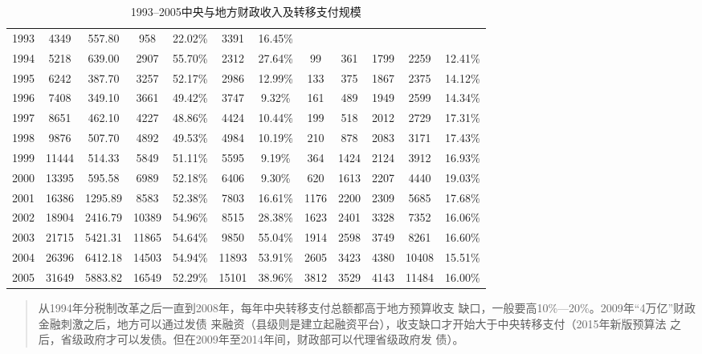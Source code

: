 \begin{table}[]
{\begin{tabular}{@{}cccccccccccc@{}}
1993 & 4349  & 557.80  & 958   & 22.02\% & 3391  & 16.45\% &      &      &      &       &         \\
1994 & 5218  & 639.00  & 2907  & 55.70\% & 2312  & 27.64\% & 99   & 361  & 1799 & 2259  & 12.41\% \\
1995 & 6242  & 387.70  & 3257  & 52.17\% & 2986  & 12.99\% & 133  & 375  & 1867 & 2375  & 14.12\% \\
1996 & 7408  & 349.10  & 3661  & 49.42\% & 3747  & 9.32\%  & 161  & 489  & 1949 & 2599  & 14.34\% \\
1997 & 8651  & 462.10  & 4227  & 48.86\% & 4424  & 10.44\% & 199  & 518  & 2012 & 2729  & 17.31\% \\
1998 & 9876  & 507.70  & 4892  & 49.53\% & 4984  & 10.19\% & 210  & 878  & 2083 & 3171  & 17.43\% \\
1999 & 11444 & 514.33  & 5849  & 51.11\% & 5595  & 9.19\%  & 364  & 1424 & 2124 & 3912  & 16.93\% \\
2000 & 13395 & 595.58  & 6989  & 52.18\% & 6406  & 9.30\%  & 620  & 1613 & 2207 & 4440  & 19.03\% \\
2001 & 16386 & 1295.89 & 8583  & 52.38\% & 7803  & 16.61\% & 1176 & 2200 & 2309 & 5685  & 17.68\% \\
2002 & 18904 & 2416.79 & 10389 & 54.96\% & 8515  & 28.38\% & 1623 & 2401 & 3328 & 7352  & 16.06\% \\
2003 & 21715 & 5421.31 & 11865 & 54.64\% & 9850  & 55.04\% & 1914 & 2598 & 3749 & 8261  & 16.60\% \\
2004 & 26396 & 6412.18 & 14503 & 54.94\% & 11893 & 53.91\% & 2605 & 3423 & 4380 & 10408 & 15.51\% \\
2005 & 31649 & 5883.82 & 16549 & 52.29\% & 15101 & 38.96\% & 3812 & 3529 & 4143 & 11484 & 16.00\% \\ \bottomrule
\end{tabular}%
}
\caption{1993--2005中央与地方财政收入及转移支付规模}
\label{tab:zhuanyi}
\end{table}


\begin{quotation}
  从1994年分税制改革之后一直到2008年，每年中央转移支付总额都高于地方预算收支
  缺口，一般要高10\%—20\%。2009年“4万亿”财政金融刺激之后，地方可以通过发债
  来融资（县级则是建立起融资平台），收支缺口才开始大于中央转移支付（2015年新版预算法
  之后，省级政府才可以发债。但在2009年至2014年间，财政部可以代理省级政府发
  债）。\cite{zhishenshinei}
\end{quotation}

